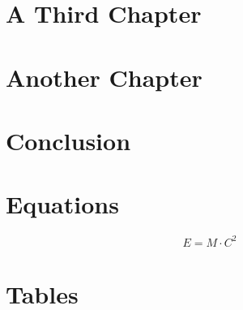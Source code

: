 \documentclass[12pt, TexShade, letterpaper]{report}
\begin{document}
\chapter{A Third Chapter}

\chapter{Another Chapter}
	
\chapter{Conclusion}

	{
	
	
	
	
	}
\appendix
\chapter{Equations}
\begin{equation}
    E = M\cdot C^2
\end{equation}

\chapter{Tables}
\end{document}
